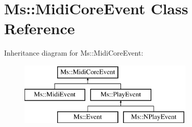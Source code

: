 \hypertarget{class_ms_1_1_midi_core_event}{}\section{Ms\+:\+:Midi\+Core\+Event Class Reference}
\label{class_ms_1_1_midi_core_event}
Inheritance diagram for Ms\+:\+:Midi\+Core\+Event\+:\begin{figure}[H]
\begin{center}
\leavevmode
\includegraphics[height=3.000000cm]{class_ms_1_1_midi_core_event}
\end{center}
\end{figure}
